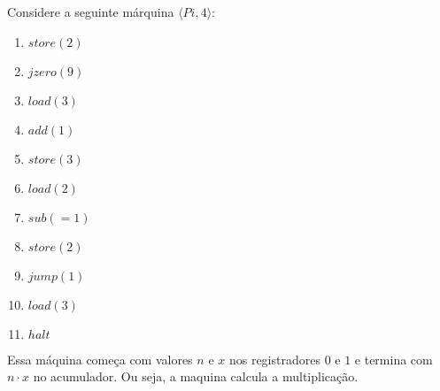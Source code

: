 \begin{example}
  Considere a seguinte márquina $\langle Pi, 4 \rangle$:
  \begin{multicols}{2}
    \begin{enumerate}
    \item $store(2)$
    \item $jzero(9)$
    \item $load(3)$
    \item $add(1)$
    \item $store(3)$
      \columnbreak
    \item $load(2)$
    \item $sub(=1)$
    \item $store(2)$
    \item $jump(1)$
    \item $load(3)$
    \item $halt$
    \end{enumerate}
  \end{multicols}
  
  Essa máquina começa com valores $n$ e $x$ nos registradores $0$ e $1$ e termina com $n \cdot x$ no acumulador.
  Ou seja, a maquina calcula a multiplicação.


\end{example}
